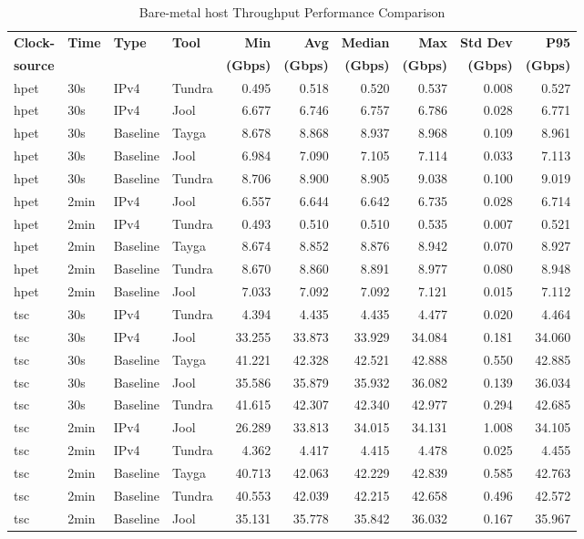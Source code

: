 \begin{table}[htbp]
\centering
\caption{Bare-metal host Throughput Performance Comparison}
\label{tab:throughput_comparison_localsingle}
\footnotesize
\begin{tabular}{|l|l|l|l|r|r|r|r|r|r|}
\hline
\textbf{Clock-} & \textbf{Time} & \textbf{Type} & \textbf{Tool} & \textbf{Min} & \textbf{Avg} & \textbf{Median} & \textbf{Max} & \textbf{Std Dev} & \textbf{P95} \\
\textbf{source} & & & & \textbf{(Gbps)} & \textbf{(Gbps)} & \textbf{(Gbps)} & \textbf{(Gbps)} & \textbf{(Gbps)} & \textbf{(Gbps)} \\
\hline
hpet & 30s & IPv4 & Tundra & 0.495 & 0.518 & 0.520 & 0.537 & 0.008 & 0.527 \\
hpet & 30s & IPv4 & Jool & 6.677 & 6.746 & 6.757 & 6.786 & 0.028 & 6.771 \\
hpet & 30s & Baseline & Tayga & 8.678 & 8.868 & 8.937 & 8.968 & 0.109 & 8.961 \\
hpet & 30s & Baseline & Jool & 6.984 & 7.090 & 7.105 & 7.114 & 0.033 & 7.113 \\
hpet & 30s & Baseline & Tundra & 8.706 & 8.900 & 8.905 & 9.038 & 0.100 & 9.019 \\
hpet & 2min & IPv4 & Jool & 6.557 & 6.644 & 6.642 & 6.735 & 0.028 & 6.714 \\
hpet & 2min & IPv4 & Tundra & 0.493 & 0.510 & 0.510 & 0.535 & 0.007 & 0.521 \\
hpet & 2min & Baseline & Tayga & 8.674 & 8.852 & 8.876 & 8.942 & 0.070 & 8.927 \\
hpet & 2min & Baseline & Tundra & 8.670 & 8.860 & 8.891 & 8.977 & 0.080 & 8.948 \\
hpet & 2min & Baseline & Jool & 7.033 & 7.092 & 7.092 & 7.121 & 0.015 & 7.112 \\
\hline
tsc & 30s & IPv4 & Tundra & 4.394 & 4.435 & 4.435 & 4.477 & 0.020 & 4.464 \\
tsc & 30s & IPv4 & Jool & 33.255 & 33.873 & 33.929 & 34.084 & 0.181 & 34.060 \\
tsc & 30s & Baseline & Tayga & 41.221 & 42.328 & 42.521 & 42.888 & 0.550 & 42.885 \\
tsc & 30s & Baseline & Jool & 35.586 & 35.879 & 35.932 & 36.082 & 0.139 & 36.034 \\
tsc & 30s & Baseline & Tundra & 41.615 & 42.307 & 42.340 & 42.977 & 0.294 & 42.685 \\
tsc & 2min & IPv4 & Jool & 26.289 & 33.813 & 34.015 & 34.131 & 1.008 & 34.105 \\
tsc & 2min & IPv4 & Tundra & 4.362 & 4.417 & 4.415 & 4.478 & 0.025 & 4.455 \\
tsc & 2min & Baseline & Tayga & 40.713 & 42.063 & 42.229 & 42.839 & 0.585 & 42.763 \\
tsc & 2min & Baseline & Tundra & 40.553 & 42.039 & 42.215 & 42.658 & 0.496 & 42.572 \\
tsc & 2min & Baseline & Jool & 35.131 & 35.778 & 35.842 & 36.032 & 0.167 & 35.967 \\
\hline
\end{tabular}
\end{table}

